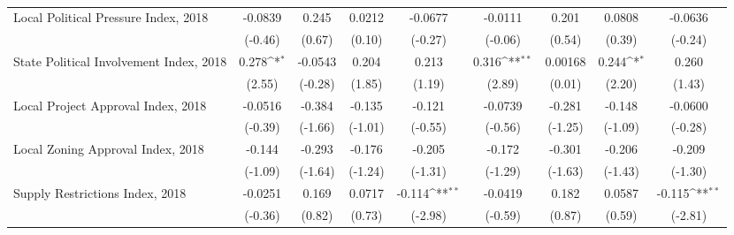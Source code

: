 \begin{table}[htbp]\centering
\def\sym#1{\ifmmode^{#1}\else\(^{#1}\)\fi}
\caption{ \label{tab1}}
\begin{tabular}{l*{8}{c}}
\toprule
\midrule
Local Political Pressure Index, 2018&     -0.0839         &       0.245         &      0.0212         &     -0.0677         &     -0.0111         &       0.201         &      0.0808         &     -0.0636         \\
                    &     (-0.46)         &      (0.67)         &      (0.10)         &     (-0.27)         &     (-0.06)         &      (0.54)         &      (0.39)         &     (-0.24)         \\
\addlinespace
State Political Involvement Index, 2018&       0.278\sym{*}  &     -0.0543         &       0.204         &       0.213         &       0.316\sym{**} &     0.00168         &       0.244\sym{*}  &       0.260         \\
                    &      (2.55)         &     (-0.28)         &      (1.85)         &      (1.19)         &      (2.89)         &      (0.01)         &      (2.20)         &      (1.43)         \\
\addlinespace
Local Project Approval Index, 2018&     -0.0516         &      -0.384         &      -0.135         &      -0.121         &     -0.0739         &      -0.281         &      -0.148         &     -0.0600         \\
                    &     (-0.39)         &     (-1.66)         &     (-1.01)         &     (-0.55)         &     (-0.56)         &     (-1.25)         &     (-1.09)         &     (-0.28)         \\
\addlinespace
Local Zoning Approval Index, 2018&      -0.144         &      -0.293         &      -0.176         &      -0.205         &      -0.172         &      -0.301         &      -0.206         &      -0.209         \\
                    &     (-1.09)         &     (-1.64)         &     (-1.24)         &     (-1.31)         &     (-1.29)         &     (-1.63)         &     (-1.43)         &     (-1.30)         \\
\addlinespace
Supply Restrictions Index, 2018&     -0.0251         &       0.169         &      0.0717         &      -0.114\sym{**} &     -0.0419         &       0.182         &      0.0587         &      -0.115\sym{**} \\
                    &     (-0.36)         &      (0.82)         &      (0.73)         &     (-2.98)         &     (-0.59)         &      (0.87)         &      (0.59)         &     (-2.81)         \\

\end{tabular}
\end{table}
